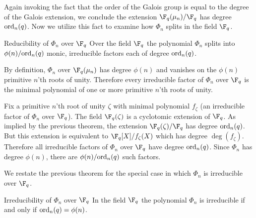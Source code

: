 Again invoking the fact that the order of the Galois group is equal to the degree of the Galois extension, we conclude the extension $\F_q(\mu_n)/\F_q$ has degree $\text{ord}_n(q)$.
Now we utilize this fact to examine how $\Phi_n$ splits in the field $\F_q$.

\begin{theorem}{Reducibility of $\Phi_n$ over $\F_q$}
    Over the field $\F_q$ the polynomial $\Phi_n$ splits into $\phi(n)/\text{ord}_n(q)$ monic, irreducible factors each of degree $\text{ord}_n(q)$.

    \proof
    By definition, $\Phi_n$ over $\F_q(\mu_n)$ has degree $\phi(n)$ and vanishes on the $\phi(n)$ primitive $n$'th roots of unity.
    Therefore every irreducible factor of $\Phi_n$ over $\F_q$ is the minimal polynomial of one or more primitive $n$'th roots of unity.

    Fix a primitive $n$'th root of unity $\zeta$ with minimal polynomial $f_\zeta$ (an irreducible factor of $\Phi_n$ over $\F_q$).
    The field $\F_q(\zeta)$ is a cyclotomic extension of $\F_q$.
    As implied by the previous theorem, the extension $\F_q(\zeta)/\F_q$ has degree $\text{ord}_n(q)$.
    But this extension is equivalent to $\F_q[X]/f_\zeta(X)$ which has degree $\deg(f_\zeta)$.
    Therefore all irreducible factors of $\Phi_n$ over $\F_q$ have degree $\text{ord}_n(q)$.
    Since $\Phi_n$ has degree $\phi(n)$, there are $\phi(n)/\text{ord}_n(q)$ such factors.
\end{theorem}

We restate the previous theorem for the special case in which $\Phi_n$ is irreducible over $\F_q$.

\begin{corollary}{Irreducibility of $\Phi_n$ over $\F_q$}
    In the field $\F_q$ the polynomial $\Phi_n$ is irreducible if and only if $\text{ord}_n(q)=\phi(n)$.
\end{corollary}


